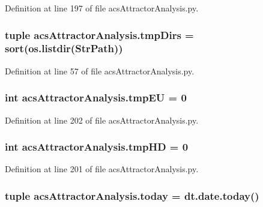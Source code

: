 Definition at line 197 of file acs\-Attractor\-Analysis.\-py.

\hypertarget{a00091_ac88c3245a42ebefee3fcf90626f6eaf4}{
\subsubsection[{tmp\-Dirs}]{\setlength{\rightskip}{0pt plus 5cm}tuple acs\-Attractor\-Analysis.\-tmp\-Dirs = sort(os.\-listdir({\bf Str\-Path}))}}\label{a00091_ac88c3245a42ebefee3fcf90626f6eaf4}


Definition at line 57 of file acs\-Attractor\-Analysis.\-py.

\hypertarget{a00091_a0c4860774229747cda9dabe70614abc6}{
\subsubsection[{tmp\-E\-U}]{\setlength{\rightskip}{0pt plus 5cm}int acs\-Attractor\-Analysis.\-tmp\-E\-U = 0}}\label{a00091_a0c4860774229747cda9dabe70614abc6}


Definition at line 202 of file acs\-Attractor\-Analysis.\-py.

\hypertarget{a00091_a1fe1582f1d1dc5f55558d25c8eb30ad7}{
\subsubsection[{tmp\-H\-D}]{\setlength{\rightskip}{0pt plus 5cm}int acs\-Attractor\-Analysis.\-tmp\-H\-D = 0}}\label{a00091_a1fe1582f1d1dc5f55558d25c8eb30ad7}


Definition at line 201 of file acs\-Attractor\-Analysis.\-py.

\hypertarget{a00091_a71bc5e3d205016fb7893b438e75be78e}{
\subsubsection[{today}]{\setlength{\rightskip}{0pt plus 5cm}tuple acs\-Attractor\-Analysis.\-today = dt.\-date.\-today()}}\label{a00091_a71bc5e3d205016fb7893b438e75be78e}


